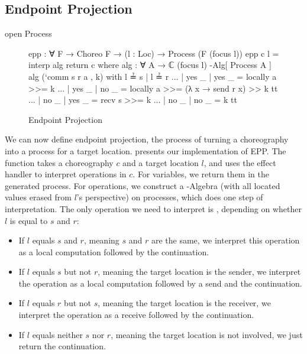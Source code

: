 \subsection{Endpoint Projection} \label{sec:epp}

\begin{code}[hide]
open Process
\end{code}

\begin{figure}[ht]
\begin{code}
epp : ∀ {F} → Choreo F → (l : Loc) → Process (F (focus l))
epp c l = interp alg return c
  where
    alg : ∀ {A} → ℂ (focus l) -Alg[ Process A ]
    alg (`comm s r a , k) with l ≟ s | l ≟ r
    ... | yes _  | yes _  = locally a >>= k
    ... | yes _  | no  _  = locally a >>= (λ x → send r x) >> k tt
    ... | no  _  | yes _  = recv s >>= k
    ... | no  _  | no  _  = k tt
\end{code}
\caption{Endpoint Projection}
\label{fig:epp}
\end{figure}

We can now define endpoint projection, the process of turning a choreography into a process for a target location.
%
 presents our implementation of EPP.
%
The function  takes a choreography $c$ and a target location $l$, and uses the effect handler  to interpret operations in $c$.
%
For variables, we return them in the generated process.
%
For operations, we construct a -Algebra (with all located values erased from $l$'s perspective)  on processes, which does one step of interpretation.
%
The only operation we need to interpret is , depending on whether $l$ is equal to $s$ and $r$:
%
\begin{itemize}
\item
  If $l$ equals $s$ and $r$, meaning $s$ and $r$ are the same, we interpret this operation as a local computation followed by the continuation.
\item
  If $l$ equals $s$ but not $r$, meaning the target location is the sender, we interpret the operation as a local computation followed by a send and the continuation.
\item
  If $l$ equals $r$ but not $s$, meaning the target location is the receiver, we interpret the operation as a receive followed by the continuation.
\item
  If $l$ equals neither $s$ nor $r$, meaning the target location is not involved, we just return the continuation.
\end{itemize}
